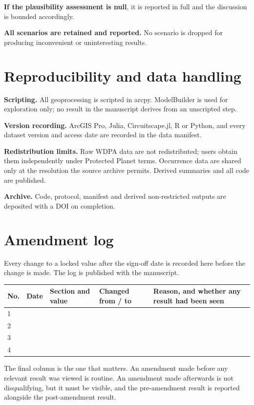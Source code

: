 \textbf{If the plausibility assessment is null}, it is reported in full and the
discussion is bounded accordingly.

\textbf{All scenarios are retained and reported.} No scenario is dropped for
producing inconvenient or uninteresting results.

\section{Reproducibility and data handling}

\textbf{Scripting.} All geoprocessing is scripted in arcpy. ModelBuilder is used
for exploration only; no result in the manuscript derives from an unscripted
step.

\textbf{Version recording.} ArcGIS Pro, Julia, Circuitscape.jl, R or Python, and
every dataset version and access date are recorded in the data manifest.

\textbf{Redistribution limits.} Raw WDPA data are not redistributed; users
obtain them independently under Protected Planet terms. Occurrence data are
shared only at the resolution the source archive permits. Derived summaries and
all code are published.

\textbf{Archive.} Code, protocol, manifest and derived non-restricted outputs
are deposited with a DOI on completion.

\section{Amendment log}
\label{sec:amend}

Every change to a locked value after the sign-off date is recorded here before
the change is made. The log is published with the manuscript.

\begin{center}
\begin{tabular}{@{}p{1.4cm}p{1.6cm}p{3.4cm}p{3.2cm}p{4.4cm}@{}}
\toprule
No. & Date & Section and value & Changed from / to & Reason, and whether any result had been seen \\
\midrule
1 & & & & \\[10pt]
2 & & & & \\[10pt]
3 & & & & \\[10pt]
4 & & & & \\[10pt]
\bottomrule
\end{tabular}
\end{center}

\vspace{6pt}
\noindent The final column is the one that matters. An amendment made before any
relevant result was viewed is routine. An amendment made afterwards is not
disqualifying, but it must be visible, and the pre-amendment result is reported
alongside the post-amendment result.


